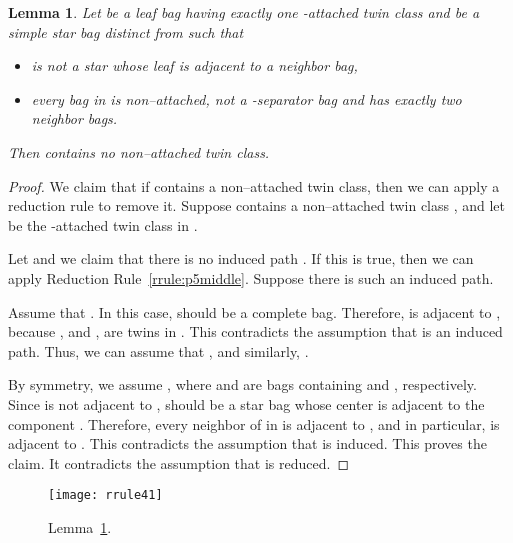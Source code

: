 \documentclass[11pt]{elsarticle}
\newtheorem{lemma}[theorem]{Lemma}
\begin{document}
\begin{lemma}\label{rrule:sattachedleaf}
Let  be a leaf bag having exactly one -attached twin class and  be a simple star bag distinct from  such that 
\begin{itemize}
\item  is not a star whose leaf is adjacent to a neighbor bag,
\item every bag in  is non--attached, not a -separator bag and has exactly two neighbor bags.
\end{itemize}
Then  contains no non--attached twin class.
\end{lemma}
\begin{proof}
We claim that if  contains a non--attached twin class, then we can apply a reduction rule to remove it.
Suppose  contains a non--attached twin class , 
and let  be the -attached twin class in .

Let  and we claim that there is no induced path .
If this is true, then we can apply Reduction Rule~\ref{rrule:p5middle}. 
Suppose there is such an induced path.

Assume that . In this case,  should be a complete bag.
Therefore,  is adjacent to , 
because , and ,  are twins in .
This contradicts the assumption that  is an induced path. Thus, we can assume that , and similarly, .


By symmetry, we assume , where  and  are bags containing  and , respectively.
Since  is not adjacent to ,  should be a star bag whose center is adjacent to the component . 
Therefore, every neighbor of  in  is adjacent to , and in particular,  is adjacent to . 
This contradicts the assumption that  is induced.
This proves the claim.
It contradicts the assumption that  is reduced.
\end{proof}



  \begin{figure}[t]
    \centering
      \texttt{[image: rrule41]}


    \caption{Lemma~\ref{rrule:sattachedleaf}.} \label{fig:rrule3}
      
  \end{figure}
\end{document}
